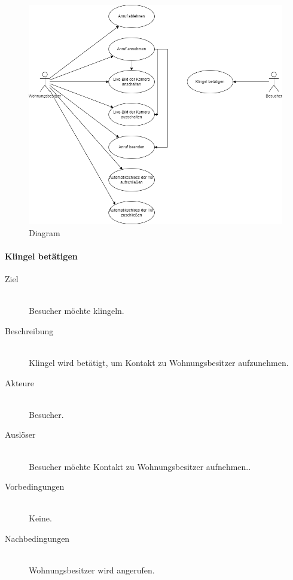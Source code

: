 \begin{figure}[ht!]
    \includegraphics[width=\paperwidth-2in]{../assets/img/UML-Anwendungsfalldiagramme-Klingeln bei einem Mehrfamilienhaus}
    \caption{Diagram}
    \label{fig:diagram}
\end{figure}


\paragraph{Klingel betätigen}
    \begin{description}
        \item[Ziel]\hfill \\
        Besucher möchte klingeln.
        \item[Beschreibung]\hfill \\
        Klingel wird betätigt, um Kontakt zu Wohnungsbesitzer aufzunehmen.
        \item[Akteure]\hfill \\
        Besucher.
        \item[Auslöser]\hfill \\
        Besucher möchte Kontakt zu Wohnungsbesitzer aufnehmen..
        \item[Vorbedingungen]\hfill \\
        Keine.
        \item[Nachbedingungen]\hfill \\
        Wohnungsbesitzer wird angerufen.
        \end{description}

